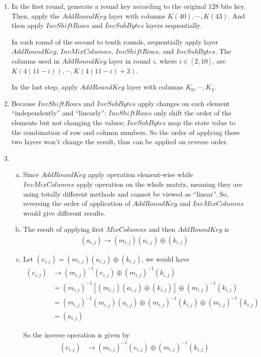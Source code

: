 \documentclass[11pt,a4paper]{article}
\begin{document}
\begin{enumerate}
	\item In the first round, generate a round key according to the original $128$ bits key. Then, apply the $\mathit{AddRoundKey}$ layer with columns $K(40),\cdots,K(43)$. And then apply $\mathit{InvShiftRows}$ and $\mathit{InvSubBytes}$ layers sequentially.
	\par In each round of the second to tenth rounds, sequentially apply layer $\mathit{AddRoundKey}$, $\mathit{InvMixColumns}$, $\mathit{InvShiftRows}$, and $\mathit{InvSubBytes}$. The columns used in $\mathit{AddRoundKey}$ layer in round $i$, where $i\in [2,10]$, are $K(4(11-i)),\cdots,K(4(11-i)+3)$.
	\par In the last step, apply $\mathit{AddRoundKey}$ layer with columns $K_{0},\cdots,K_{3}$.
	
	\item Because $\mathit{InvShiftRows}$ and $\mathit{InvSubBytes}$ apply changes on each element ``independently'' and ``linearly'': $\mathit{InvShiftRows}$ only shift the order of the elements but not changing the values; $\mathit{InvSubBytes}$ map the state value to the combination of row and column numbers. So the order of applying these two layers won't change the result, thus can be applied on reverse order.

	\item
	\begin{enumerate}[(a)]
		\item Since $\mathit{AddRoundKey}$ apply operation element-wise while $\mathit{InvMixColumns}$ apply operation on the whole matrix, meaning they are using totally different methods and cannot be viewed as ``linear''. So, reversing the order of application of $\mathit{AddRoundKey}$ and $\mathit{InvMixColumns}$ would give different results.
		
		\item The result of applying first $\mathit{MixColumns}$ and then $\mathit{AddRoundKey}$ is
		\begin{align*}
			(a_{i,j}) \rightarrow (m_{i,j})(a_{i,j}) \oplus (k_{i,j})
		\end{align*}
		
		\item Let $(e_{i,j}) = (m_{i,j})(a_{i,j}) \oplus (k_{i,j})$, we would have
		\begin{align*}
			(e_{i,j}) &\rightarrow (m_{i,j})^{-1}(e_{i,j}) \oplus (m_{i,j})^{-1}(k_{i,j}) \\
			&= (m_{i,j})^{-1}[(m_{i,j})(a_{i,j}) \oplus (k_{i,j})] \oplus (m_{i,j})^{-1}(k_{i,j}) \\
			&= (m_{i,j})^{-1}(m_{i,j})(a_{i,j}) \oplus (m_{i,j})^{-1}(k_{i,j}) \oplus (m_{i,j})^{-1}(k_{i,j}) \\
			&= (a_{i,j})
		\end{align*}
		\par So the inverse operation is given by 
		\begin{align*}
			(e_{i,j}) &\rightarrow (m_{i,j})^{-1}(e_{i,j}) \oplus (m_{i,j})^{-1}(k_{i,j})
		\end{align*}
		

\end{enumerate}
\end{enumerate}
\end{document}
